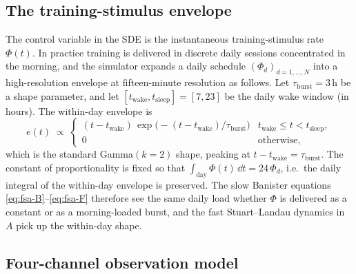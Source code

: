 \subsection{The training-stimulus envelope}

The control variable in the SDE is the instantaneous training-stimulus
rate $\Phi(t)$. In practice training is delivered in discrete daily
sessions concentrated in the morning, and the simulator expands a daily
schedule $(\Phi_d)_{d=1,\dots,N}$ into a high-resolution envelope at
fifteen-minute resolution as follows. Let
$\tau_{\mathrm{burst}}=3\,\mathrm{h}$ be a shape parameter, and let
$[t_{\mathrm{wake}},t_{\mathrm{sleep}}] = [7,23]$ be the daily wake
window (in hours). The within-day envelope is
\begin{equation}
  e(t) \;\propto\;
    \begin{cases}
      (t-t_{\mathrm{wake}})\,\exp\!\bigl(-(t-t_{\mathrm{wake}})/\tau_{\mathrm{burst}}\bigr)
        & t_{\mathrm{wake}} \le t < t_{\mathrm{sleep}}, \\
      0  & \text{otherwise},
    \end{cases}
  \label{eq:phi-envelope}
\end{equation}
which is the standard Gamma$(k=2)$ shape, peaking at
$t-t_{\mathrm{wake}} = \tau_{\mathrm{burst}}$. The constant of
proportionality is fixed so that
$\int_{\text{day}} \Phi(t)\,\dd t = 24\,\Phi_d$, i.e.~the daily integral
of the within-day envelope is preserved. The slow Banister equations
\eqref{eq:fsa-B}--\eqref{eq:fsa-F} therefore see the same daily load
whether $\Phi$ is delivered as a constant or as a morning-loaded burst,
and the fast Stuart--Landau dynamics in $A$ pick up the within-day shape.

\subsection{Four-channel observation model}

